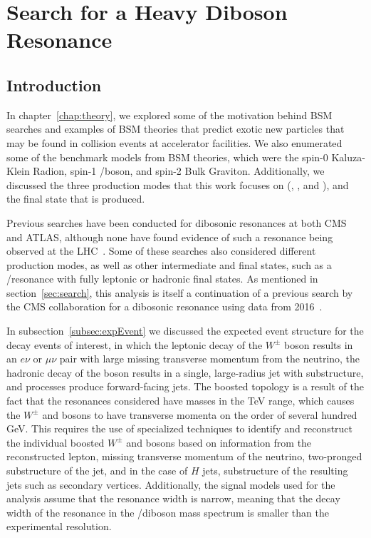 
\chapter{Search for a Heavy Diboson Resonance}
\label{chap:analysis}

\section{Introduction}

In chapter~\ref{chap:theory}, we explored some of the motivation behind BSM searches and examples of BSM theories that predict exotic new particles that may be found in collision events at accelerator facilities.
We also enumerated some of the benchmark models from BSM theories, which were the spin-0 Kaluza-Klein Radion, spin-1 \Wpr/\Zpr boson, and spin-2 Bulk Graviton.
Additionally, we discussed the three production modes that this work focuses on (\VBF, \ggF, and \DY), and the final state that is produced.

Previous searches have been conducted for dibosonic resonances at both CMS and ATLAS, although none have found evidence of such a resonance being observed at the LHC~\cite{Aaboud_18,Aaboud_18_2,Aad_15,Khachatryan_14,Sirunyan_17,Sirunyan_17_2,Aad:2020ddw}.
Some of these searches also considered different production modes, as well as other intermediate and final states, such as a \ZZ/\ZH resonance with fully leptonic or hadronic final states.
As mentioned in section~\ref{sec:search}, this analysis is itself a continuation of a previous search by the CMS collaboration for a dibosonic resonance using data from 2016~\cite{Sirunyan_18}.

In subsection~\ref{subsec:expEvent} we discussed the expected event structure for the decay events of interest, in which the leptonic decay of the $W^\pm$ boson results in an $e\nu$ or $\mu\nu$ pair with large missing transverse momentum from the neutrino, the hadronic decay of the \VorH boson results in a single, large-radius jet with substructure, and \VBF processes produce forward-facing jets.
The boosted topology is a result of the fact that the resonances considered have masses in the TeV range, which causes the $W^\pm$ and \VorH bosons to have transverse momenta on the order of several hundred GeV.
This requires the use of specialized techniques to identify and reconstruct the individual boosted $W^\pm$ and \VorH bosons based on information from the reconstructed lepton, missing transverse momentum of the neutrino, two-pronged substructure of the jet, and in the case of $H$ jets, substructure of the resulting \bbbar jets such as secondary vertices.
Additionally, the signal models used for the analysis assume that the resonance width is narrow, meaning that the decay width of the resonance in the \WV/\WH diboson mass spectrum is smaller than the experimental resolution.

